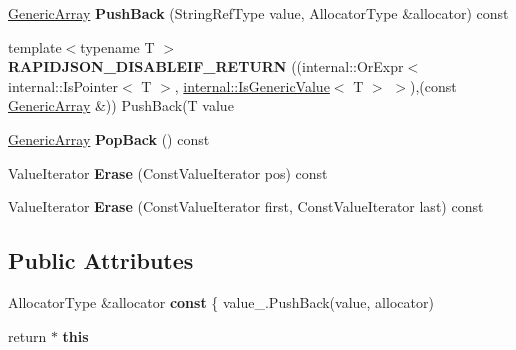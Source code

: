 \begin{DoxyCompactItemize}
\item 
\hyperlink{class_generic_array}{Generic\+Array} {\bfseries Push\+Back} (String\+Ref\+Type value, Allocator\+Type \&allocator) const \hypertarget{class_generic_array_af583610a94a0fe360a5cbfd34fe8aa6c}{}\label{class_generic_array_af583610a94a0fe360a5cbfd34fe8aa6c}

\item 
{\footnotesize template$<$typename T $>$ }\\{\bfseries R\+A\+P\+I\+D\+J\+S\+O\+N\+\_\+\+D\+I\+S\+A\+B\+L\+E\+I\+F\+\_\+\+R\+E\+T\+U\+RN} ((internal\+::\+Or\+Expr$<$ internal\+::\+Is\+Pointer$<$ T $>$, \hyperlink{structinternal_1_1_is_generic_value}{internal\+::\+Is\+Generic\+Value}$<$ T $>$ $>$),(const \hyperlink{class_generic_array}{Generic\+Array} \&)) Push\+Back(T value\hypertarget{class_generic_array_a12adff0c1e11aa3be6f4160015a65df0}{}\label{class_generic_array_a12adff0c1e11aa3be6f4160015a65df0}

\item 
\hyperlink{class_generic_array}{Generic\+Array} {\bfseries Pop\+Back} () const \hypertarget{class_generic_array_a87a5a9acf7b26a81df42a54553bdbec4}{}\label{class_generic_array_a87a5a9acf7b26a81df42a54553bdbec4}

\item 
Value\+Iterator {\bfseries Erase} (Const\+Value\+Iterator pos) const \hypertarget{class_generic_array_a1d71be1384a0184514d9921d77b6a060}{}\label{class_generic_array_a1d71be1384a0184514d9921d77b6a060}

\item 
Value\+Iterator {\bfseries Erase} (Const\+Value\+Iterator first, Const\+Value\+Iterator last) const \hypertarget{class_generic_array_a105cb20275127cbd73fbc24e6af41dd1}{}\label{class_generic_array_a105cb20275127cbd73fbc24e6af41dd1}

\end{DoxyCompactItemize}
\subsection*{Public Attributes}
\begin{DoxyCompactItemize}
\item 
Allocator\+Type \&allocator {\bfseries const} \{ value\+\_\+.\+Push\+Back(value, allocator)\hypertarget{class_generic_array_ad2a012026f03984afd83b53179387b4e}{}\label{class_generic_array_ad2a012026f03984afd83b53179387b4e}

\item 
return $\ast$ {\bfseries this}\hypertarget{class_generic_array_ae5b7ae255e696185dd68931ef9f667c0}{}\label{class_generic_array_ae5b7ae255e696185dd68931ef9f667c0}

\end{DoxyCompactItemize}
